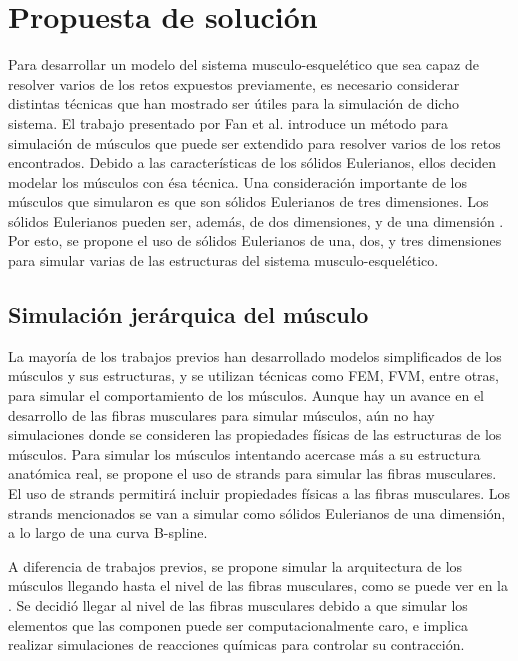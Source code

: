 \chapter{Propuesta de solución}
\label{PropuestaSolucion}


Para desarrollar un modelo del sistema musculo-esquelético que sea capaz de resolver varios de los retos expuestos previamente, es necesario considerar distintas técnicas que han mostrado ser útiles para la simulación de dicho sistema. El trabajo presentado por Fan et al. \citep{fan2014active} introduce un método para simulación de músculos que puede ser extendido para resolver varios de los retos encontrados. Debido a las características de los sólidos Eulerianos, ellos deciden modelar los músculos con ésa técnica. Una consideración importante de los músculos que simularon es que son sólidos Eulerianos de tres dimensiones. Los sólidos Eulerianos pueden ser, además, de dos dimensiones, y de una dimensión \citep{pai2014eulerian}. Por esto, se propone el uso de sólidos Eulerianos de una, dos, y tres dimensiones para simular varias de las estructuras del sistema musculo-esquelético.

\section{Simulación jerárquica del músculo}

La mayoría de los trabajos previos han desarrollado modelos simplificados de los músculos y sus estructuras, y se utilizan técnicas como FEM, FVM, entre otras, para simular el comportamiento de los músculos. Aunque hay un avance en el desarrollo de las fibras musculares para simular músculos, aún no hay simulaciones donde se consideren las propiedades físicas de las estructuras de los músculos. Para simular los músculos intentando acercase más a su estructura anatómica real, se propone el uso de strands \citep{pai2002strands, pai2011dynamics} para simular las fibras musculares. El uso de strands permitirá incluir propiedades físicas a las fibras musculares. Los strands mencionados se van a simular como sólidos Eulerianos de una dimensión, a lo largo de una curva B-spline.

A diferencia de trabajos previos, se propone simular la arquitectura de los músculos llegando hasta el nivel de las fibras musculares, como se puede ver en la . Se decidió llegar al nivel de las fibras musculares debido a que simular los elementos que las componen puede ser computacionalmente caro, e implica realizar simulaciones de reacciones químicas para controlar su contracción. 

